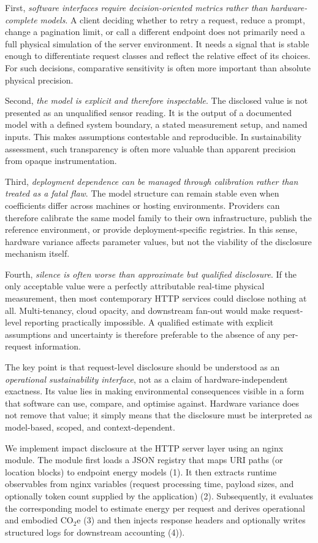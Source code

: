 First, \emph{software interfaces require decision-oriented metrics rather than hardware-complete models}. A client deciding whether to retry a request, reduce a prompt, change a pagination limit, or call a different endpoint does not primarily need a full physical simulation of the server environment. It needs a signal that is stable enough to differentiate request classes and reflect the relative effect of its choices. For such decisions, comparative sensitivity is often more important than absolute physical precision.

Second, \emph{the model is explicit and therefore inspectable}. The disclosed value is not presented as an unqualified sensor reading. It is the output of a documented model with a defined system boundary, a stated measurement setup, and named inputs. This makes assumptions contestable and reproducible. In sustainability assessment, such transparency is often more valuable than apparent precision from opaque instrumentation.

Third, \emph{deployment dependence can be managed through calibration rather than treated as a fatal flaw}. The model structure can remain stable even when coefficients differ across machines or hosting environments. Providers can therefore calibrate the same model family to their own infrastructure, publish the reference environment, or provide deployment-specific registries. In this sense, hardware variance affects parameter values, but not the viability of the disclosure mechanism itself.

Fourth, \emph{silence is often worse than approximate but qualified disclosure}. If the only acceptable value were a perfectly attributable real-time physical measurement, then most contemporary HTTP services could disclose nothing at all. Multi-tenancy, cloud opacity, and downstream fan-out would make request-level reporting practically impossible. A qualified estimate with explicit assumptions and uncertainty is therefore preferable to the absence of any per-request information.

The key point is that request-level disclosure should be understood as an \emph{operational sustainability interface}, not as a claim of hardware-independent exactness. Its value lies in making environmental consequences visible in a form that software can use, compare, and optimise against. Hardware variance does not remove that value; it simply means that the disclosure must be interpreted as model-based, scoped, and context-dependent.


We implement impact disclosure at the HTTP server layer using an nginx module. The module first
loads a JSON registry that maps URI paths (or location blocks) to endpoint energy models (1). It then extracts runtime observables from nginx variables (request processing time, payload sizes, and optionally token count supplied by the application) (2). Subsequently, it evaluates the corresponding model to estimate energy per request and derives operational and embodied \(\mathrm{CO_2e}\) (3) and then injects response headers and optionally writes structured logs for downstream accounting (4)).

